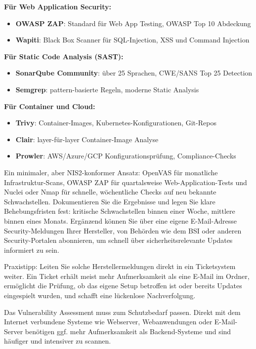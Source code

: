 \textbf{Für Web Application Security:}
\begin{itemize}
    \item \textbf{OWASP ZAP}: Standard für Web App Testing, OWASP Top 10 Abdeckung
    \item \textbf{Wapiti}: Black Box Scanner für SQL-Injection, XSS und Command Injection
\end{itemize}

\textbf{Für Static Code Analysis (SAST):}
\begin{itemize}
    \item \textbf{SonarQube Community}: über 25 Sprachen, CWE/SANS Top 25 Detection
    \item \textbf{Semgrep}: pattern-basierte Regeln, moderne Static Analysis
\end{itemize}

\textbf{Für Container und Cloud:}
\begin{itemize}
    \item \textbf{Trivy}: Container-Images, Kubernetes-Konfigurationen, Git-Repos
    \item \textbf{Clair}: layer-für-layer Container-Image Analyse
    \item \textbf{Prowler}: AWS/Azure/GCP Konfigurationsprüfung, Compliance-Checks
\end{itemize}

Ein minimaler, aber NIS2-konformer Ansatz: OpenVAS für monatliche Infrastruktur-Scans, OWASP ZAP für quartalsweise Web-Application-Tests und Nuclei oder Nmap für schnelle, wöchentliche Checks auf neu bekannte Schwachstellen. Dokumentieren Sie die Ergebnisse und legen Sie klare Behebungsfristen fest: kritische Schwachstellen binnen einer Woche, mittlere binnen eines Monats. Ergänzend können Sie über eine eigene E-Mail-Adresse Security-Meldungen Ihrer Hersteller, von Behörden wie dem BSI oder anderen Security-Portalen abonnieren, um schnell über sicherheitsrelevante Updates informiert zu sein.

Praxistipp: Leiten Sie solche Herstellermeldungen direkt in ein Ticketsystem weiter. Ein Ticket erhält meist mehr Aufmerksamkeit als eine E-Mail im Ordner, ermöglicht die Prüfung, ob das eigene Setup betroffen ist oder bereits Updates eingespielt wurden, und schafft eine lückenlose Nachverfolgung.

Das Vulnerability Assessment muss zum Schutzbedarf passen. Direkt mit dem Internet verbundene Systeme wie Webserver, Webanwendungen oder E-Mail-Server benötigen ggf. mehr Aufmerksamkeit als Backend-Systeme und sind häufiger und intensiver zu scannen.

